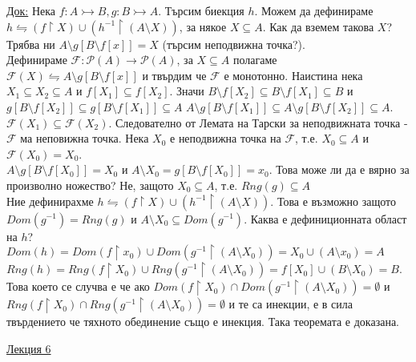 \documentclass[fleqn, titlepage, 12pt]{report}
\begin{document}
\underline{Док:} Нека $f: A \rightarrowtail B, g: B \rightarrowtail A$. Търсим биекция $h$. Можем да дефинираме \\
$h \leftrightharpoons (f \upharpoonright X) \cup (h^{-1} \upharpoonright (A \setminus X))$, за някое $X \subseteq A$.
Как да вземем такова $X$?\\
Трябва ни $A \setminus g[B \setminus f[x]] = X$ (търсим неподвижна точка?).\\
Дефинираме $\mathcal{F}: \mathcal{P}(A) \rightarrow \mathcal{P}(A)$, за $X \subseteq A$ полагаме
$\mathcal{F}(X) \leftrightharpoons A \setminus g[B \setminus f[x]]$ и твърдим че $\mathcal{F}$ е монотонно.
Наистина нека $X_1 \subseteq X_2 \subseteq A$ и $f[X_1] \subseteq f[X_2]$.
Значи $B \setminus f[X_2] \subseteq B \setminus f[X_1] \subseteq B$ и
$g[B \setminus f[X_2]] \subseteq g[B \setminus f[X_1]] \subseteq A$
$A \setminus g[B \setminus f[X_1]] \subseteq A \setminus g[B \setminus f[X_2]] \subseteq A$.\\
$\mathcal{F}(X_1) \subseteq \mathcal{F}(X_2)$. Следователно от Лемата на Тарски за неподвижната точка -
$\mathcal{F}$ ма неповижна точка. Нека $X_0$ е неподвижна точка на $\mathcal{F}$, т.е. $X_0 \subseteq A$ и $\mathcal{F}(X_0) = X_0$.\\
$A \setminus g[B \setminus f[X_0]] = X_0$ и $A \setminus X_0 = g[B \setminus f[X_0]] = x_0$.
Това може ли да е вярно за произволно ножество? Не, защото $X_0 \subseteq A$, т.е. $Rng(g) \subseteq A$\\
Ние дефинирахме $ h \leftrightharpoons (f \upharpoonright X) \cup (h^{-1} \upharpoonright (A \setminus X)) $.
Това е възможно защото $Dom(g^{-1}) = Rng(g)$ и $A \setminus X_0 \subseteq Dom(g^{-1})$.
Каква е дефиниционната област на $h$?
$Dom(h) = Dom(f \upharpoonright x_0) \cup Dom(g^{-1} \upharpoonright (A \setminus X_0))
= X_0 \cup (A \setminus x_0) = A$\\
$Rng(h) = Rng(f \upharpoonright X_0) \cup Rng(g^{-1} \upharpoonright (A \setminus X_0))
= f[X_0] \cup  (B \setminus X_0) = B$. Това което се случва е че ако
$Dom(f \upharpoonright X_0) \cap Dom(g^{-1} \upharpoonright (A \setminus X_0)) = \emptyset$ и
$Rng(f \upharpoonright X_0) \cap Rng(g^{-1} \upharpoonright (A \setminus X_0)) = \emptyset$ и те са инекции,
е в сила твърдението че тяхното обединение също е инекция. Така теоремата е доказана.
\bigbreak

\clearpage
\begin{center}
  \underline{\huge\normalfont Лекция 6}
\end{center}
\end{document}
